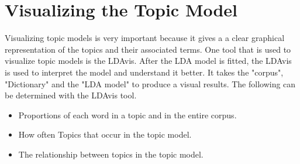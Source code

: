 \section{Visualizing the Topic Model}
Visualizing topic models is very important because it gives a
a clear graphical representation of the topics and their associated  terms. One  tool that is used to visualize topic models is the LDAvis. After the LDA model is fitted, the LDAvis is used to interpret the model and understand it better. It takes the "corpus", "Dictionary" and the "LDA model" to produce a visual results. The following can be determined with the LDAvis tool.
\begin{itemize}
\item Proportions of each word in a topic and in the entire corpus.
\item How often Topics that occur in the topic model.
\item The relationship between topics in the topic model.
\end{itemize}

